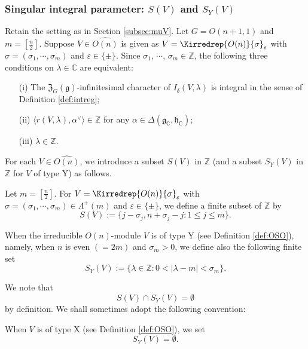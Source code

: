 \subsubsection{Singular integral parameter:
$S(V)$ and $S_Y(V)$}
Retain the setting as in Section \ref{subsec:muV}.  
Let $G=O(n+1,1)$ and $m=[\frac n 2]$.  
Suppose $V \in \widehat{O(n)}$
 is given as $V = \Kirredrep{O(n)}{\sigma}_{\varepsilon}$
 with $\sigma=(\sigma_1, \cdots, \sigma_m)$ and $\varepsilon \in \{\pm\}$.  
Since $\sigma_1$, $\cdots$, $\sigma_{m} \in {\mathbb{Z}}$,  
 the following three conditions
 on $\lambda \in {\mathbb{C}}$ are equivalent:
\begin{enumerate}
\item[(i)]
The ${\mathfrak{Z}}_G({\mathfrak{g}})$-infinitesimal character
 of $I_{\delta}(V,\lambda)$ is integral 
 in the sense of Definition \ref{def:intreg};
\item[(ii)]
$\langle r(V,\lambda), \alpha^{\vee} \rangle \in {\mathbb{Z}}$ for any $\alpha \in \Delta({\mathfrak{g}}_{\mathbb{C}}, {\mathfrak{h}}_{\mathbb{C}})$;
\item[(iii)]
 $\lambda \in {\mathbb{Z}}$.  
\end{enumerate}



For each $V \in \widehat {O(n)}$, 
 we introduce a subset $S(V)$ in ${\mathbb{Z}}$
 (and a subset $S_Y(V)$ in ${\mathbb{Z}}$ for $V$ of type Y) 
 as follows.  
\begin{definition}
[$S(V)$ and $S_Y(V)$]
\label{def:SVSYV}
Let $m=[\frac n 2]$.  
For $V=\Kirredrep{O(n)}{\sigma}_{\varepsilon}$
 with $\sigma=(\sigma_1, \cdots, \sigma_m) \in \Lambda^+(m)$
 and $\varepsilon \in \{\pm\}$, 
 we define a finite subset of ${\mathbb{Z}}$ by 
\begin{equation}
\label{eqn:singint}
  S(V):=\{j-\sigma_j, n+\sigma_j-j: 1 \le j \le m\}.  
\end{equation}


When the irreducible $O(n)$-module $V$
 is of 
 type Y
 (see Definition \ref{def:OSO}), 
 namely, 
when $n$ is even $(=2m)$ and $\sigma_m > 0$, 
 we define also the following finite set
\begin{equation}
\label{eqn:SYsigma}
  S_Y(V):=\{\lambda \in {\mathbb{Z}} : 0 < |\lambda-m| <\sigma_m\}.  
\end{equation}
\end{definition}
We note that 
\[
  S(V) \cap S_Y(V) = \emptyset
\]
by definition.  
We shall sometimes adopt the following convention:
\begin{convention}
\label{conv:SYsigma}
When $V$ is of type X (see Definition \ref{def:OSO}), 
 we set
\[
   S_Y(V) = \emptyset.  
\]
\end{convention}



